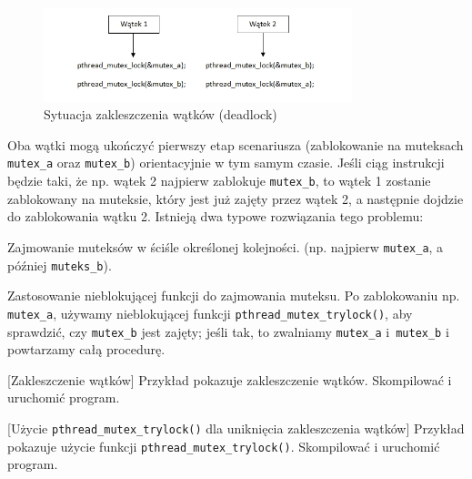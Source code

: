 \begin{figure}[!h]
\centering
\includegraphics[width=0.8\textwidth]{img/deadlock}
\caption{Sytuacja zakleszczenia wątków (deadlock)}
\label{fig:W16R0}
\end{figure}

Oba wątki mogą ukończyć pierwszy etap scenariusza (zablokowanie na muteksach  \lstinline[style=MyCStyle]{mutex_a} oraz  \lstinline[style=MyCStyle]{mutex_b}) orientacyjnie w tym samym czasie. Jeśli ciąg instrukcji będzie taki, że np. wątek 2 najpierw zablokuje  \lstinline[style=MyCStyle]{mutex_b}, to wątek 1 zostanie zablokowany na muteksie, który jest już zajęty przez wątek 2, a następnie dojdzie do zablokowania wątku 2. Istnieją dwa typowe rozwiązania tego problemu:

\begin{myitemize}
\item Zajmowanie muteksów w ściśle określonej kolejności. (np. najpierw \lstinline[style=MyCStyle]{mutex_a}, a później \lstinline[style=MyCStyle]{muteks_b}).
\item Zastosowanie nieblokującej funkcji do zajmowania muteksu. Po zablokowaniu np. \lstinline[style=MyCStyle]{mutex_a}, używamy nieblokującej funkcji \lstinline[style=MyCStyle]{pthread_mutex_trylock()}, aby sprawdzić, czy \lstinline[style=MyCStyle]{mutex_b} jest zajęty; jeśli tak, to zwalniamy \lstinline[style=MyCStyle]{mutex_a} i~\lstinline[style=MyCStyle]{mutex_b} i powtarzamy całą procedurę.
\end{myitemize}

\begin{example}{[Zakleszczenie wątków]}
Przykład pokazuje zakleszczenie wątków. Skompilować i uruchomić program.


\end{example}

\begin{example}{[Użycie \texttt{pthread\_mutex\_trylock()} dla uniknięcia zakleszczenia wątków]}
Przykład pokazuje użycie funkcji \texttt{pthread\_mutex\_trylock()}. Skompilować i uruchomić program.


\end{example}

